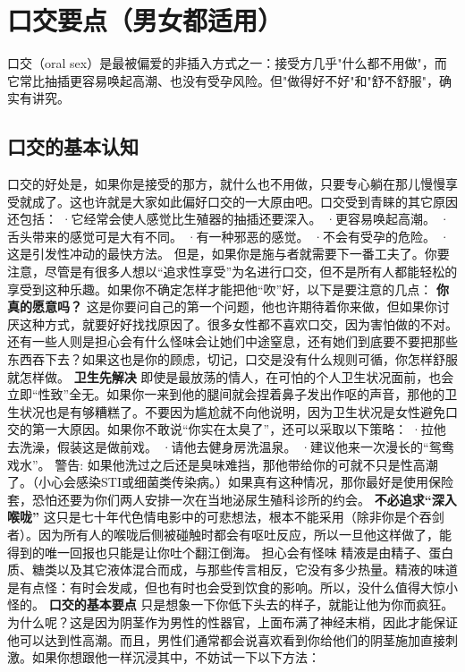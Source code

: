 \documentclass[12pt,UTF8,openany]{ctexbook}
\begin{document}
\section{口交要点（男女都适用）}

口交（oral sex）是最被偏爱的非插入方式之一：接受方几乎"什么都不用做"，而它常比抽插更容易唤起高潮、也没有受孕风险。但"做得好不好"和"舒不舒服"，确实有讲究。

\subsection*{口交的基本认知}
口交的好处是，如果你是接受的那方，就什么也不用做，只要专心躺在那儿慢慢享受就成了。这也许就是大家如此偏好口交的一大原由吧。口交受到青睐的其它原因还包括：
·它经常会使人感觉比生殖器的抽插还要深入。
·更容易唤起高潮。
·舌头带来的感觉可是大有不同。
·有一种邪恶的感觉。
·不会有受孕的危险。
·这是引发性冲动的最快方法。
但是，如果你是施与者就需要下一番工夫了。你要注意，尽管是有很多人想以“追求性享受”为名进行口交，但不是所有人都能轻松的享受到这种乐趣。如果你不确定怎样才能把他“吹”好，以下是要注意的几点：
\textbf{你真的愿意吗？}
这是你要问自己的第一个问题，他也许期待着你来做，但如果你讨厌这种方式，就要好好找找原因了。很多女性都不喜欢口交，因为害怕做的不对。还有一些人则是担心会有什么怪味会让她们中途窒息，还有她们到底要不要把那些东西吞下去？如果这也是你的顾虑，切记，口交是没有什么规则可循，你怎样舒服就怎样做。
\textbf{卫生先解决}
即使是最放荡的情人，在可怕的个人卫生状况面前，也会立即“性致”全无。如果你一来到他的腿间就会捏着鼻子发出作呕的声音，那他的卫生状况也是有够糟糕了。不要因为尴尬就不向他说明，因为卫生状况是女性避免口交的第一大原因。如果你不敢说“你实在太臭了”，还可以采取以下策略：
·拉他去洗澡，假装这是做前戏。
·请他去健身房洗温泉。
·建议他来一次漫长的“鸳鸯戏水”。
警告:
如果他洗过之后还是臭味难挡，那他带给你的可就不只是性高潮了。（小心会感染STI或细菌类传染病。）如果真有这种情况，那你最好是使用保险套，恐怕还要为你们两人安排一次在当地泌尿生殖科诊所的约会。
\textbf{不必追求“深入喉咙”}
这只是七十年代色情电影中的可悲想法，根本不能采用（除非你是个吞剑者）。因为所有人的喉咙后侧被碰触时都会有呕吐反应，所以一旦他这样做了，能得到的唯一回报也只能是让你吐个翻江倒海。
担心会有怪味
精液是由精子、蛋白质、糖类以及其它液体混合而成，与那些传言相反，它没有多少热量。精液的味道是有点怪：有时会发咸，但也有时也会受到饮食的影响。所以，没什么值得大惊小怪的。
\textbf{口交的基本要点}
只是想象一下你低下头去的样子，就能让他为你而疯狂。为什么呢？这是因为阴茎作为男性的性器官，上面布满了神经末梢，因此才能保证他可以达到性高潮。而且，男性们通常都会说喜欢看到你给他们的阴茎施加直接刺激。如果你想跟他一样沉浸其中，不妨试一下以下方法：
\end{document}
